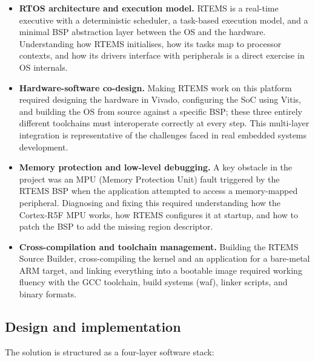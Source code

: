 \documentclass[10pt,a4]{article}
\begin{document}
\begin{itemize}
  \item \textbf{RTOS architecture and execution model.}
        RTEMS is a real-time executive with a deterministic scheduler, a
        task-based execution model, and a minimal BSP abstraction layer between
        the OS and the hardware.
        Understanding how RTEMS initialises, how its tasks map to processor
        contexts, and how its drivers interface with peripherals is a direct
        exercise in OS internals.

  \item \textbf{Hardware-software co-design.}
        Making RTEMS work on this platform required designing the hardware in
        Vivado, configuring the SoC using Vitis, and building the OS from source
        against a specific BSP; these three entirely different toolchains must
        interoperate correctly at every step.
        This multi-layer integration is representative of the challenges faced
        in real embedded systems development.

  \item \textbf{Memory protection and low-level debugging.}
        A key obstacle in the project was an MPU (Memory Protection Unit)
        fault triggered by the RTEMS BSP when the application attempted to
        access a memory-mapped peripheral.
        Diagnosing and fixing this required understanding how the Cortex-R5F MPU
        works, how RTEMS configures it at startup, and how to patch the BSP
        to add the missing region descriptor.

  \item \textbf{Cross-compilation and toolchain management.}
        Building the RTEMS Source Builder, cross-compiling the kernel and an
        application for a bare-metal ARM target, and linking everything into a
        bootable image required working fluency with the GCC toolchain,
        build systems (waf), linker scripts, and binary formats.
\end{itemize}


\subsection{Design and implementation}

The solution is structured as a four-layer software stack:
\end{document}
